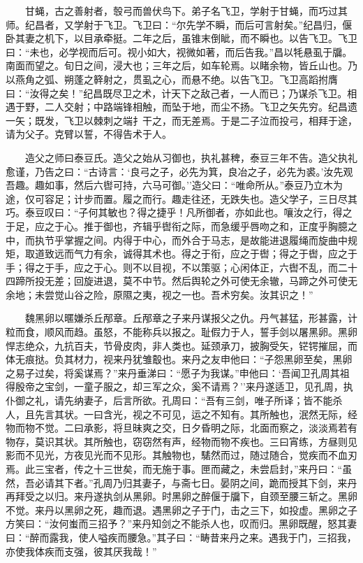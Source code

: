 　　甘蝇，古之善射者，彀弓而兽伏鸟下。弟子名飞卫，学射于甘蝇，而巧过其师。纪昌者，又学射于飞卫。飞卫曰：``尔先学不瞬，而后可言射矣。''纪昌归，偃卧其妻之机下，以目承牵挺。二年之后，虽锥末倒眦，而不瞬也。以告飞卫。飞卫曰：``未也，必学视而后可。视小如大，视微如著，而后告我。''昌以牦悬虱于牖。南面而望之。旬日之间，浸大也；三年之后，如车轮焉。以睹余物，皆丘山也。乃以燕角之弧、朔蓬之簳射之，贯虱之心，而悬不绝。以告飞卫。飞卫高蹈拊膺曰：``汝得之矣！''纪昌既尽卫之术，计天下之敌己者，一人而已；乃谋杀飞卫。相遇于野，二人交射；中路端锋相触，而坠于地，而尘不扬。飞卫之矢先穷。纪昌遗一矢；既发，飞卫以棘刺之端扌干之，而无差焉。于是二子泣而投弓，相拜于途，请为父子。克臂以誓，不得告术于人。

　　造父之师曰泰豆氏。造父之始从习御也，执礼甚稗，泰豆三年不告。造父执礼愈谨，乃告之曰：``古诗言：`良弓之子，必先为箕，良冶之子，必先为裘。'汝先观吾趣。趣如事，然后六辔可持，六马可御。''造父曰：``唯命所从。''泰豆乃立木为途，仅可容足；计步而置。履之而行。趣走往还，无跌失也。造父学子，三日尽其巧。泰豆叹曰：``子何其敏也？得之捷乎！凡所御者，亦如此也。嚷汝之行，得之于足，应之于心。推于御也，齐辑乎辔衔之际，而急缓乎唇吻之和，正度乎胸臆之中，而执节乎掌握之间。内得于中心，而外合于马志，是故能进退履绳而旋曲中规矩，取道致远而气力有余，诚得其术也。得之于衔，应之于辔；得之于辔，应之于手；得之于手，应之于心。则不以目视，不以策驱；心闲体正，六辔不乱，而二十四蹄所投无差；回旋进退，莫不中节。然后舆轮之外可使无余辙，马蹄之外可使无余地；未尝觉山谷之险，原隰之夷，视之一也。吾术穷矣。汝其识之！''

　　魏黑卵以暱嫌杀丘邴章。丘邴章之子来丹谋报父之仇。丹气甚猛，形甚露，计粒而食，顺风而趋。虽怒，不能称兵以报之。耻假力于人，誓手剑以屠黑卵。黑卵悍志绝众，九抗百夫，节骨皮肉，非人类也。延颈承刀，披胸受矢，铓锷摧屈，而体无痕挞。负其材力，视来丹犹雏鷇也。来丹之友申他曰：``子怨黑卵至矣，黑卵之易子过矣，将奚谋焉？''来丹垂涕曰：``愿子为我谋。''申他曰：`吾闻卫孔周其祖得殷帝之宝剑，一童子服之，却三军之众，奚不请焉？''来丹遂适卫，见孔周，执仆御之礼，请先纳妻子，后言所欲。孔周曰：``吾有三剑，唯子所译；皆不能杀人，且先言其状。一曰含光，视之不可见，运之不知有。其所触也，泯然无际，经物而物不觉。二曰承影，将旦昧爽之交，日夕昏明之际，北面而察之，淡淡焉若有物存，莫识其状。其所触也，窃窃然有声，经物而物不疾也。三曰宵练，方昼则见影而不见光，方夜见光而不见形。其触物也，騞然而过，随过随合，觉疾而不血刃焉。此三宝者，传之十三世矣，而无施于事。匣而藏之，未尝启封，''来丹曰：``虽然，吾必请其下者。''孔周乃归其妻子，与斋七日。晏阴之间，跪而授其下剑，来丹再拜受之以归。来丹遂执剑从黑卵。时黑卵之醉偃于牖下，自颈至腰三斩之。黑卵不觉。来丹以黑卵之死，趣而退。遇黑卵之子于门，击之三下，如投虚。黑卵之子方笑曰：``汝何蚩而三招予？''来丹知剑之不能杀人也，叹而归。黑卵既醒，怒其妻曰：``醉而露我，使人嗌疾而腰急。''其子曰：``畴昔来丹之来。遇我于门，三招我，亦使我体疾而支强，彼其厌我哉！''

